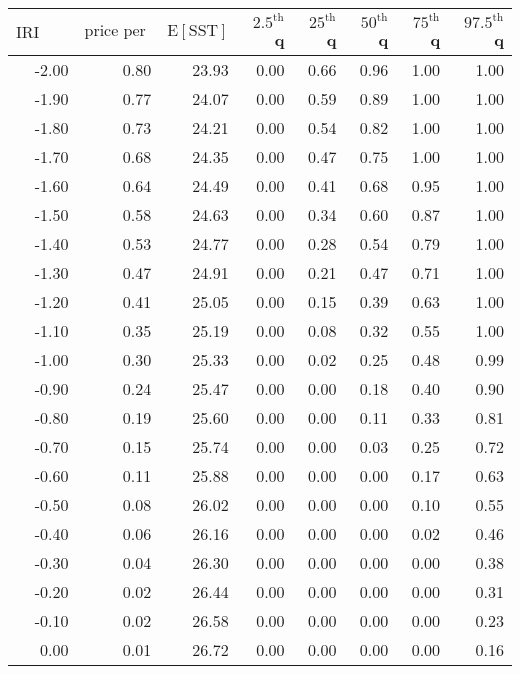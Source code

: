 
\begin{table*}[ht]
\centering \footnotesize
\begin{tabular}{rrrrrrrr}
  \hline
$\mbox{IRI anom}$ & $\mbox{price per USD}$ & $\mbox{E}[\mbox{SST}]$ & $2.5^{\mbox{th}}$ q & $25^{\mbox{th}}$ q & $50^{\mbox{th}}$ q & $75^{\mbox{th}}$ q & $97.5^{\mbox{th}}$ q \\ 
  \hline
-2.00 & 0.80 & 23.93 & 0.00 & 0.66 & 0.96 & 1.00 & 1.00 \\ 
  -1.90 & 0.77 & 24.07 & 0.00 & 0.59 & 0.89 & 1.00 & 1.00 \\ 
  -1.80 & 0.73 & 24.21 & 0.00 & 0.54 & 0.82 & 1.00 & 1.00 \\ 
  -1.70 & 0.68 & 24.35 & 0.00 & 0.47 & 0.75 & 1.00 & 1.00 \\ 
  -1.60 & 0.64 & 24.49 & 0.00 & 0.41 & 0.68 & 0.95 & 1.00 \\ 
  -1.50 & 0.58 & 24.63 & 0.00 & 0.34 & 0.60 & 0.87 & 1.00 \\ 
  -1.40 & 0.53 & 24.77 & 0.00 & 0.28 & 0.54 & 0.79 & 1.00 \\ 
  -1.30 & 0.47 & 24.91 & 0.00 & 0.21 & 0.47 & 0.71 & 1.00 \\ 
  -1.20 & 0.41 & 25.05 & 0.00 & 0.15 & 0.39 & 0.63 & 1.00 \\ 
  -1.10 & 0.35 & 25.19 & 0.00 & 0.08 & 0.32 & 0.55 & 1.00 \\ 
  -1.00 & 0.30 & 25.33 & 0.00 & 0.02 & 0.25 & 0.48 & 0.99 \\ 
  -0.90 & 0.24 & 25.47 & 0.00 & 0.00 & 0.18 & 0.40 & 0.90 \\ 
  -0.80 & 0.19 & 25.60 & 0.00 & 0.00 & 0.11 & 0.33 & 0.81 \\ 
  -0.70 & 0.15 & 25.74 & 0.00 & 0.00 & 0.03 & 0.25 & 0.72 \\ 
  -0.60 & 0.11 & 25.88 & 0.00 & 0.00 & 0.00 & 0.17 & 0.63 \\ 
  -0.50 & 0.08 & 26.02 & 0.00 & 0.00 & 0.00 & 0.10 & 0.55 \\ 
  -0.40 & 0.06 & 26.16 & 0.00 & 0.00 & 0.00 & 0.02 & 0.46 \\ 
  -0.30 & 0.04 & 26.30 & 0.00 & 0.00 & 0.00 & 0.00 & 0.38 \\ 
  -0.20 & 0.02 & 26.44 & 0.00 & 0.00 & 0.00 & 0.00 & 0.31 \\ 
  -0.10 & 0.02 & 26.58 & 0.00 & 0.00 & 0.00 & 0.00 & 0.23 \\ 
  0.00 & 0.01 & 26.72 & 0.00 & 0.00 & 0.00 & 0.00 & 0.16 \\ 

\end{tabular}
\end{table*}
